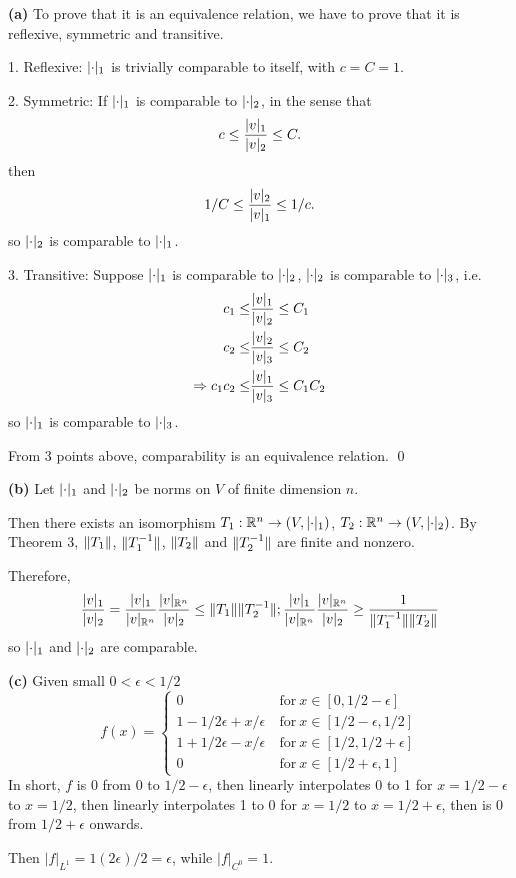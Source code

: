 \documentclass[a4paper, 12pt]{article}
\begin{document}
\begin{solution}
    \textbf{(a)} To prove that it is an equivalence relation, we have to prove that it is reflexive, symmetric and transitive.

    1. Reflexive: $\lvert\cdot\rvert_1$ is trivially comparable to itself, with $c = C = 1$.

    2. Symmetric: If $\lvert\cdot\rvert_1$ is comparable to $\lvert\cdot\rvert_2$, in the sense that \[
        c \leq \frac{\lvert v\rvert_1}{\lvert v\rvert_2} \leq C.
    \]
    then \[
        1/C \leq \frac{\lvert v\rvert_2}{\lvert v\rvert_1} \leq 1/c.
    \]
    so $\lvert\cdot\rvert_2$ is comparable to $\lvert\cdot\rvert_1$.

    3. Transitive: Suppose $\lvert\cdot\rvert_1$ is comparable to $\lvert\cdot\rvert_2$, $\lvert\cdot\rvert_2$ is comparable to $\lvert\cdot\rvert_3$, i.e.
    \begin{align*}
        c_1 \leq              & \frac{\lvert v\rvert_1}{\lvert v\rvert_2} \leq C_1     \\
        c_2 \leq              & \frac{\lvert v\rvert_2}{\lvert v\rvert_3} \leq C_2     \\
        \Rightarrow c_1 c_2 \leq & \frac{\lvert v\rvert_1}{\lvert v\rvert_3} \leq C_1 C_2
    \end{align*}
    so $\lvert\cdot\rvert_1$ is comparable to $\lvert\cdot\rvert_3$.

    From 3 points above, comparability is an equivalence relation. \qed

    \textbf{(b)} Let $\lvert\cdot\rvert_1$ and $\lvert\cdot\rvert_2$ be norms on $V$ of finite dimension $n$.

    Then there exists an isomorphism $T_1: \mathbb{R}^n \to (V, \lvert\cdot\rvert_1)$, $T_2: \mathbb{R}^n \to (V, \lvert\cdot\rvert_2)$. By Theorem 3, $\lVert T_1\rVert$, $\lVert T_1^{-1}\rVert$, $\lVert T_2\rVert$ and $\lVert T_2^{-1}\rVert$ are finite and nonzero.

    Therefore, \[
        \frac{\lvert v\rvert_1}{\lvert v\rvert_2} = \frac{\lvert v\rvert_1}{\lvert v\rvert_{\mathbb{R}^n}} \frac{\lvert v\rvert_{\mathbb{R}^n}}{\lvert v\rvert_2} \leq \lVert T_1\rVert\lVert T_2^{-1}\rVert; \frac{\lvert v\rvert_1}{\lvert v\rvert_{\mathbb{R}^n}} \frac{\lvert v\rvert_{\mathbb{R}^n}}{\lvert v\rvert_2} \geq \frac{1}{\lVert T_1^{-1}\rVert \lVert T_2\rVert}
    \]
    so $\lvert\cdot\rvert_1$ and $\lvert\cdot\rvert_2$ are comparable.

    \textbf{(c)} Given small $0 < \epsilon < 1/2$
    \[
        f(x) = \begin{cases}
            0                            & \:\text{for}\: x \in [0, 1/2 - \epsilon]    \\
            1 - 1/2\epsilon + x/\epsilon & \:\text{for}\: x \in [1/2 - \epsilon, 1/2]  \\
            1 + 1/2\epsilon - x/\epsilon & \:\text{for}\:  x \in [1/2, 1/2 + \epsilon] \\
            0                            & \:\text{for}\:  x \in [1/2 + \epsilon, 1]
        \end{cases}
    \]
    In short, $f$ is 0 from 0 to $1/2 - \epsilon$, then linearly interpolates 0 to 1 for $x = 1/2 - \epsilon$ to $x = 1/2$, then linearly interpolates 1 to 0 for $x = 1/2$ to $x = 1/2 + \epsilon$, then is 0 from $1/2 + \epsilon$ onwards.

    Then $|f|_{L^1} = 1(2\epsilon)/2 = \epsilon$, while $|f|_{C^0} = 1$.
\end{solution}
\end{document}
